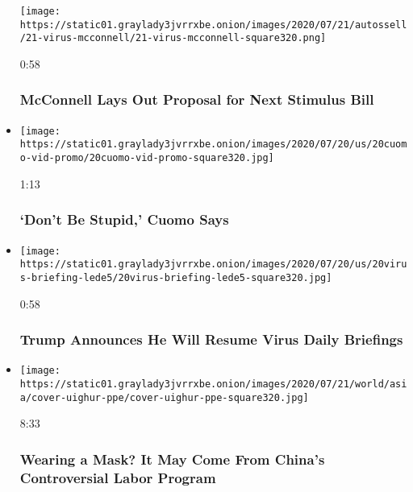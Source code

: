 \begin{itemize}
  \texttt{[image: https://static01.graylady3jvrrxbe.onion/images/2020/07/21/autossell/21-virus-mcconnell/21-virus-mcconnell-square320.png]}

  0:58

  \hypertarget{mcconnell-lays-out-proposal-for-next-stimulus-bill}{%
  \subsubsection{McConnell Lays Out Proposal for Next Stimulus
  Bill}\label{mcconnell-lays-out-proposal-for-next-stimulus-bill}}
\item
  \href{https://www.nytimes3xbfgragh.onion/video/us/politics/100000007247561/cuomo-coronavirus-warning.html?action=click\&module=video-series-bar\&region=header\&pgtype=Article\&playlistId=video/coronavirus-news-update}{}

  \texttt{[image: https://static01.graylady3jvrrxbe.onion/images/2020/07/20/us/20cuomo-vid-promo/20cuomo-vid-promo-square320.jpg]}

  1:13

  \hypertarget{dont-be-stupid-cuomo-says}{%
  \subsubsection{`Don't Be Stupid,' Cuomo
  Says}\label{dont-be-stupid-cuomo-says}}
\item
  \href{https://www.nytimes3xbfgragh.onion/video/us/100000007247407/trump-will-resume-virus-briefings.html?action=click\&module=video-series-bar\&region=header\&pgtype=Article\&playlistId=video/coronavirus-news-update}{}

  \texttt{[image: https://static01.graylady3jvrrxbe.onion/images/2020/07/20/us/20virus-briefing-lede5/20virus-briefing-lede5-square320.jpg]}

  0:58

  \hypertarget{trump-announces-he-will-resume-virus-daily-briefings}{%
  \subsubsection{Trump Announces He Will Resume Virus Daily
  Briefings}\label{trump-announces-he-will-resume-virus-daily-briefings}}
\item
  \href{https://www.nytimes3xbfgragh.onion/video/world/asia/100000007226041/china-coronavirus-masks-uighur-labor-ppe.html?action=click\&module=video-series-bar\&region=header\&pgtype=Article\&playlistId=video/coronavirus-news-update}{}

  \texttt{[image: https://static01.graylady3jvrrxbe.onion/images/2020/07/21/world/asia/cover-uighur-ppe/cover-uighur-ppe-square320.jpg]}

  8:33

  \hypertarget{wearing-a-mask-it-may-come-from-chinas-controversial-labor-program}{%
  \subsubsection{Wearing a Mask? It May Come From China's Controversial
  Labor
  Program}\label{wearing-a-mask-it-may-come-from-chinas-controversial-labor-program}}
\end{itemize}

